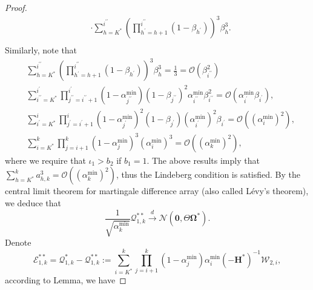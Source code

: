 \documentclass[aos]{imsart}
\numberwithin{equation}{section}
\theoremstyle{plain}
\begin{document}
\begin{appendix}
\begin{proof}
\begin{equation*}
\begin{split}
            & \cdot \sum_{h=K^{*}}^{i^{\prime \prime}}  \left( \prod_{h^{\prime}=h+1}^{i^{\prime \prime}} (1-\beta_{h^{\prime}}) \right)^3 \beta_h^3.  \\
        \end{split}
    \end{equation*}
    Similarly, note that 
    \begin{equation}
        \begin{split}
            & \sum_{h=K^{*}}^{i^{\prime \prime}}  \left( \prod_{h^{\prime}=h+1}^{i^{\prime \prime}} (1-\beta_{h^{\prime}}) \right)^3 \beta_h^3 = \frac{1}{3} = \mathcal{O} \left(\beta_{i^{\prime \prime}}^{2}  \right)\\
            & \sum_{i^{\prime \prime}=K^{*}}^{i^{\prime}} \prod_{j^{\prime \prime}=i^{\prime \prime}+1}^{i^{\prime}} (1-\alpha^{\min}_{j^{\prime \prime}}) (1-\beta_{j^{\prime \prime}})^2 \alpha^{\min}_{i^{\prime \prime}} \beta_{i^{\prime \prime}}^{2} = \mathcal{O} \left( \alpha^{\min}_{i^{\prime }} \beta_{i^{\prime }} \right),\\
            & \sum_{i^{\prime}=K^{*}}^{i} \prod_{j^{\prime}=i^{\prime}+1}^{i} (1-\alpha^{\min}_{j^{\prime}})^2 (1-\beta_{j^{\prime}}) (\alpha^{\min}_{i^{\prime}})^2 \beta_{i^{\prime}} = \mathcal{O} \left(  (\alpha^{\min}_{i})^2\right),\\
            & \sum_{i=K^{*}}^{k} \prod_{j=i+1}^{k} (1-\alpha^{\min}_j)^3 (\alpha^{\min}_i)^3 = \mathcal{O} \left(  (\alpha^{\min}_{k})^2\right),
        \end{split}
    \end{equation}
    where we require that $\iota_1 > b_2$ if $b_1 = 1$. The above results imply that $\sum_{h=K^{*}}^{k} a_{h,k}^3 = \mathcal{O} \left(  (\alpha^{\min}_{k})^2\right)$, thus the Lindeberg condition is satisfied. By the  central limit theorem for martingale difference array (also called Lévy’s theorem), we deduce that 
    \begin{equation*}
        \frac{1}{\sqrt{\alpha^{\min}_k}} \mathcal{Q}_{1,k}^{**}  \stackrel{d}{\longrightarrow} \mathcal{N} \left( \bm{0}, \Theta \bm{\Omega}^{*} \right).
    \end{equation*}
    Denote  
    \begin{equation*}
        \mathcal{E}_{1,k}^{**} = \mathcal{Q}_{1,k}^{*} - \mathcal{Q}_{1,k}^{**} := \sum_{i=K^{*}}^{k} \prod_{j=i+1}^{k} (1-\alpha^{\min}_j) \alpha^{\min}_i \left(-\bm{H}^{*}\right)^{-1}   \mathcal{W}_{2,i},
    \end{equation*}
    according to Lemma, we have

\end{proof}
\end{appendix}
\end{document}
